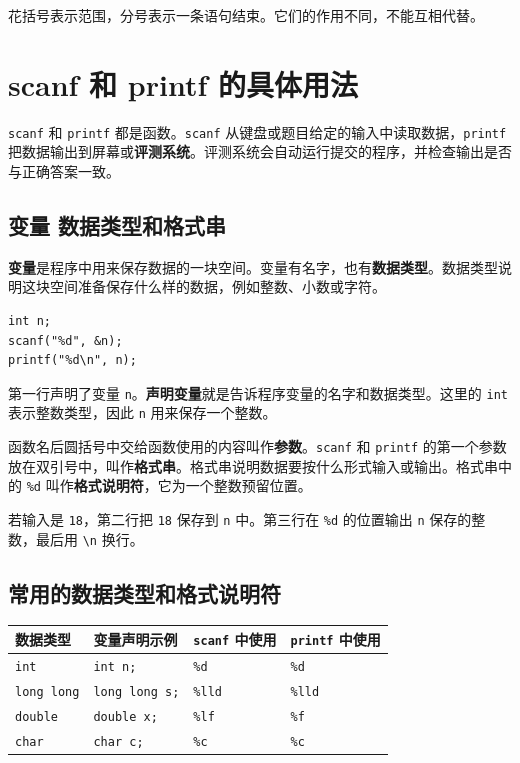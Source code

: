 \documentclass[UTF8,zihao=-4,fontset=windows]{ctexart}
\newcommand{\term}[1]{\textbf{\color{navy}#1}}
\begin{document}
花括号表示范围，分号表示一条语句结束。它们的作用不同，不能互相代替。

\section{scanf 和 printf 的具体用法}

\verb|scanf| 和 \verb|printf| 都是函数。\verb|scanf| 从键盘或题目给定的输入中读取数据，\verb|printf| 把数据输出到屏幕或\term{评测系统}。评测系统会自动运行提交的程序，并检查输出是否与正确答案一致。

\subsection{变量 数据类型和格式串}

\term{变量}是程序中用来保存数据的一块空间。变量有名字，也有\term{数据类型}。数据类型说明这块空间准备保存什么样的数据，例如整数、小数或字符。

\begin{lstlisting}[style=cstyle]
int n;
scanf("%d", &n);
printf("%d\n", n);
\end{lstlisting}

第一行声明了变量 \verb|n|。\term{声明变量}就是告诉程序变量的名字和数据类型。这里的 \verb|int| 表示整数类型，因此 \verb|n| 用来保存一个整数。

函数名后圆括号中交给函数使用的内容叫作\term{参数}。\verb|scanf| 和 \verb|printf| 的第一个参数放在双引号中，叫作\term{格式串}。格式串说明数据要按什么形式输入或输出。格式串中的 \verb|%d| 叫作\term{格式说明符}，它为一个整数预留位置。

若输入是 \verb|18|，第二行把 \verb|18| 保存到 \verb|n| 中。第三行在 \verb|%d| 的位置输出 \verb|n| 保存的整数，最后用 \verb|\n| 换行。

\subsection{常用的数据类型和格式说明符}

\begin{center}
\begin{tabularx}{0.93\textwidth}{>{\centering\arraybackslash}p{2.2cm} >{\centering\arraybackslash}p{3.1cm} X X}
\toprule
数据类型 & 变量声明示例 & \texttt{scanf} 中使用 & \texttt{printf} 中使用 \\
\midrule
\texttt{int} & \texttt{int n;} & \texttt{\%d} & \texttt{\%d} \\
\texttt{long long} & \texttt{long long s;} & \texttt{\%lld} & \texttt{\%lld} \\
\texttt{double} & \texttt{double x;} & \texttt{\%lf} & \texttt{\%f} \\
\texttt{char} & \texttt{char c;} & \texttt{\%c} & \texttt{\%c} \\
\bottomrule
\end{tabularx}
\end{center}
\end{document}
